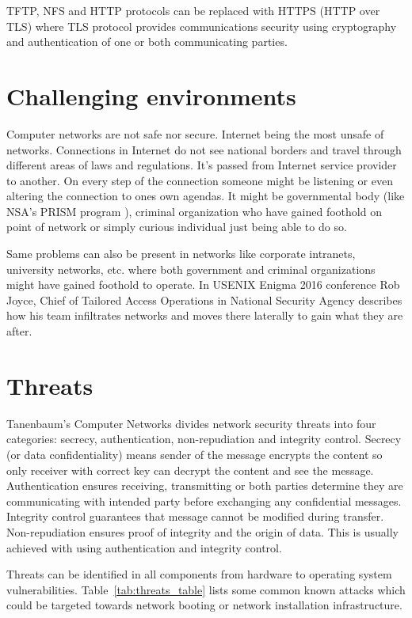 TFTP, NFS and HTTP protocols can be replaced with HTTPS (HTTP over
TLS) where TLS protocol provides communications security using
cryptography and authentication of one or both communicating parties.


\section{Challenging environments}

Computer networks are not safe nor secure. Internet being the most
unsafe of networks. Connections in Internet do not see national
borders and travel through different areas of laws and
regulations. It's passed from Internet service provider to another. On
every step of the connection someone might be listening or even
altering the connection to ones own agendas. It might be governmental
body (like NSA's PRISM program \cite{nsa-prism}), criminal
organization who have gained foothold on point of network or simply
curious individual just being able to do so.

Same problems can also be present in networks like corporate
intranets, university networks, etc. where both government and
criminal organizations might have gained foothold to operate. In
USENIX Enigma 2016 conference Rob Joyce, Chief of Tailored Access
Operations in National Security Agency \cite{nsa-tao} describes how
his team infiltrates networks and moves there laterally to gain what
they are after.


\section{Threats}

Tanenbaum's Computer Networks\cite{Tanenbaum} divides network security
threats into four categories: secrecy, authentication, non-repudiation
and integrity control. Secrecy (or data confidentiality) means sender
of the message encrypts the content so only receiver with correct key
can decrypt the content and see the message. Authentication ensures
receiving, transmitting or both parties determine they are
communicating with intended party before exchanging any confidential
messages. Integrity control guarantees that message cannot be modified
during transfer. Non-repudiation ensures proof of integrity and the
origin of data. This is usually achieved with using authentication and
integrity control.

Threats can be identified in all components from hardware to
operating system vulnerabilities. Table~\ref{tab:threats_table} lists
some common known attacks which could be targeted towards network
booting or network installation infrastructure.

